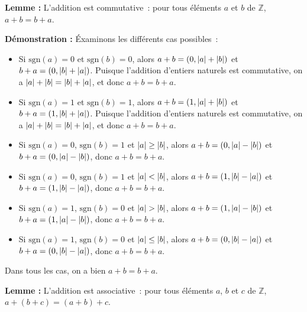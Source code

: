    \done 

\medskip

\noindent\textbf{Lemme :} L'addition est commutative : pour tous éléments $a$ et $b$ de $\mathbb{Z}$, $a + b = b + a$.

\medskip

\noindent\textbf{Démonstration :} Éxaminons les différents cas possibles : 
    \begin{itemize}[nosep]
        \item Si $\mathrm{sgn}(a) = 0$ et $\mathrm{sgn}(b) = 0$, alors $a + b = (0, \left\lvert a \right\rvert + \left\lvert b \right\rvert)$ et $b + a = (0, \left\lvert b \right\rvert + \left\lvert a \right\rvert)$.
            Puisque l'addition d'entiers naturels est commutative, on a $\left\lvert a \right\rvert + \left\lvert b \right\rvert = \left\lvert b \right\rvert + \left\lvert a \right\rvert$, et donc $a + b = b + a$.
        \item Si $\mathrm{sgn}(a) = 1$ et $\mathrm{sgn}(b) = 1$, alors $a + b = (1, \left\lvert a \right\rvert + \left\lvert b \right\rvert)$ et $b + a = (1, \left\lvert b \right\rvert + \left\lvert a \right\rvert)$.
            Puisque l'addition d'entiers naturels est commutative, on a $\left\lvert a \right\rvert + \left\lvert b \right\rvert = \left\lvert b \right\rvert + \left\lvert a \right\rvert$, et donc $a + b = b + a$.
        \item Si $\mathrm{sgn}(a) = 0$, $\mathrm{sgn}(b) = 1$ et $\left\lvert a \right\rvert \geq \left\lvert b \right\rvert$, alors $a + b = (0, \left\lvert a \right\rvert - \left\lvert b \right\rvert)$ et $b + a = (0, \left\lvert a \right\rvert - \left\lvert b \right\rvert)$, donc $a + b = b + a$.
        \item Si $\mathrm{sgn}(a) = 0$, $\mathrm{sgn}(b) = 1$ et $\left\lvert a \right\rvert < \left\lvert b \right\rvert$, alors $a + b = (1, \left\lvert b \right\rvert - \left\lvert a \right\rvert)$ et $b + a = (1, \left\lvert b \right\rvert - \left\lvert a \right\rvert)$, donc $a + b = b + a$.
        \item Si $\mathrm{sgn}(a) = 1$, $\mathrm{sgn}(b) = 0$ et $\left\lvert a \right\rvert > \left\lvert b \right\rvert$, alors $a + b = (1, \left\lvert a \right\rvert - \left\lvert b \right\rvert)$ et $b + a = (1, \left\lvert a \right\rvert - \left\lvert b \right\rvert)$, donc $a + b = b + a$.
        \item Si $\mathrm{sgn}(a) = 1$, $\mathrm{sgn}(b) = 0$ et $\left\lvert a \right\rvert \leq \left\lvert b \right\rvert$, alors $a + b = (0, \left\lvert b \right\rvert - \left\lvert a \right\rvert)$ et $b + a = (0, \left\lvert b \right\rvert - \left\lvert a \right\rvert)$, donc $a + b = b + a$.
    \end{itemize}
    Dans tous les cas, on a bien $a + b = b + a$.

   \done 

\medskip

\noindent\textbf{Lemme :} L'addition est associative : pour tous éléments $a$, $b$ et $c$ de $\mathbb{Z}$, $a + (b + c) = (a + b) + c$.

\medskip

